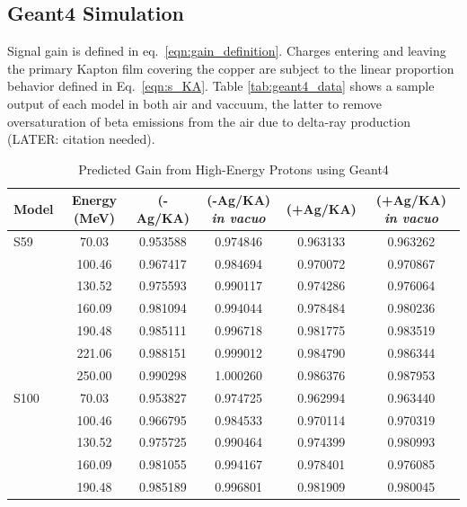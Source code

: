 \documentclass{mc2015}
\begin{document}
\subsection{Geant4 Simulation}

Signal gain is defined in eq.~\ref{eqn:gain_definition}.  Charges entering and leaving the primary Kapton film covering the copper are subject to the linear proportion behavior defined in Eq.~\ref{eqn:s_KA}.  Table \ref{tab:geant4_data} shows a sample output of each model in both air and vaccuum, the latter to remove oversaturation of beta emissions from the air due to delta-ray production (LATER: citation needed).

\begin{table}[H]
  \centering
  \caption{Predicted Gain from High-Energy Protons using Geant4}
  \begin{tabular}{lccccc}
    \toprule
    Model & Energy (MeV) & (-Ag/KA) & (-Ag/KA) \emph{in vacuo} & (+Ag/KA) & (+Ag/KA) \emph{in vacuo} \\
    \midrule
    S59 & 70.03  & \num{0.953588} & \num{0.974846} & \num{0.963133} & \num{0.963262} \\
        & 100.46 & \num{0.967417} & \num{0.984694} & \num{0.970072} & \num{0.970867} \\
        & 130.52 & \num{0.975593} & \num{0.990117} & \num{0.974286} & \num{0.976064} \\
        & 160.09 & \num{0.981094} & \num{0.994044} & \num{0.978484} & \num{0.980236} \\
        & 190.48 & \num{0.985111} & \num{0.996718} & \num{0.981775} & \num{0.983519} \\
        & 221.06 & \num{0.988151} & \num{0.999012} & \num{0.984790} & \num{0.986344} \\
        & 250.00 & \num{0.990298} & \num{1.000260} & \num{0.986376} & \num{0.987953} \\
    \midrule
    S100 & 70.03 & \num{0.953827} & \num{0.974725} & \num{0.962994} & \num{0.963440} \\
        & 100.46 & \num{0.966795} & \num{0.984533} & \num{0.970114} & \num{0.970319} \\
        & 130.52 & \num{0.975725} & \num{0.990464} & \num{0.974399} & \num{0.980993} \\
        & 160.09 & \num{0.981055} & \num{0.994167} & \num{0.978401} & \num{0.976085} \\
        & 190.48 & \num{0.985189} & \num{0.996801} & \num{0.981909} & \num{0.980045} \\

\end{tabular}
\end{table}
\end{document}
